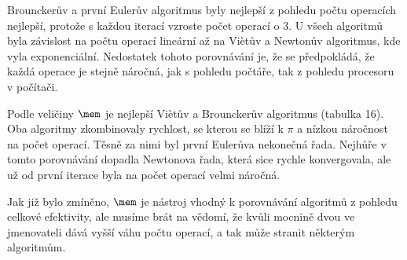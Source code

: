 \documentclass[soc]{gzwroc} %
\begin{document}
Brounckerův a první Eulerův algoritmus byly nejlepší z pohledu počtu operacích nejlepší, protože s každou iterací vzroste počet operací o 3. U všech algoritmů byla závislost na počtu operací lineární až na Viètův a Newtonův algoritmus, kde vyla exponenciální. Nedostatek tohoto porovnávání je, že se předpokládá, že každá operace je stejně náročná, jak s pohledu počtáře, tak z pohledu procesoru v počítači.

Podle veličiny $\mem$ je nejlepší Viètův a Brounckerův algoritmus (tabulka 16). Oba algoritmy zkombinovaly rychlost, se kterou se blíží k $\pi$ a nízkou náročnost na počet operací. Těsně za nimi byl první Eulerůva nekonečná řada. Nejhůře v tomto porovnávání dopadla Newtonova řada, která sice rychle konvergovala, ale už od první iterace byla na počet operací velmi náročná.

Jak již bylo zmíněno, $\mem$ je nástroj vhodný k porovnávání algoritmů z pohledu celkové efektivity, ale musíme brát na vědomí, že kvůli mocnině dvou ve jmenovateli dává vyšší váhu počtu operací, a tak může stranit některým algoritmům. 
\end{document}
